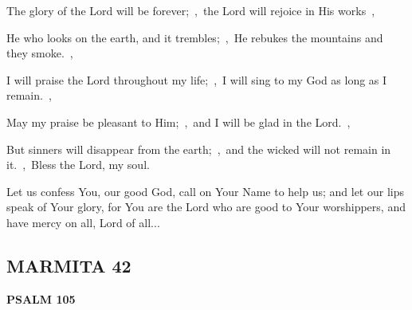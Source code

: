 \documentclass[12pt,twoside,a5paper]{article}
\newcommand{\marmita}[1]{\subsection*{MARMITA {#1}}}
\newcommand{\psalm}[1]{\textbf{PSALM {#1}}\nopagebreak}
\newcommand{\slota}[1]{\liturgicalhint{Slota.} #1}
\begin{document}
\begin{normalparskip}
  The glory of the Lord will be forever;~\sep\ the Lord will rejoice in His works~\sep

  He who looks on the earth, and it trembles;~\sep\ He rebukes the mountains and they smoke.~\sep

  I will praise the Lord throughout my life;~\sep\ I will sing to my God as long as I remain.~\sep

  May my praise be pleasant to Him;~\sep\ and I will be glad in the Lord.~\sep

  But sinners will disappear from the earth;~\sep\ and the wicked will not remain in it.~\sep\ Bless the Lord, my soul.
\end{normalparskip}

\slota{Let us confess You, our good God, call on Your Name to help us; and let our lips speak of Your glory, for You are the Lord who are good to Your worshippers, and have mercy on all, Lord of all...}

\marmita{42}

\psalm{105}
\end{document}

